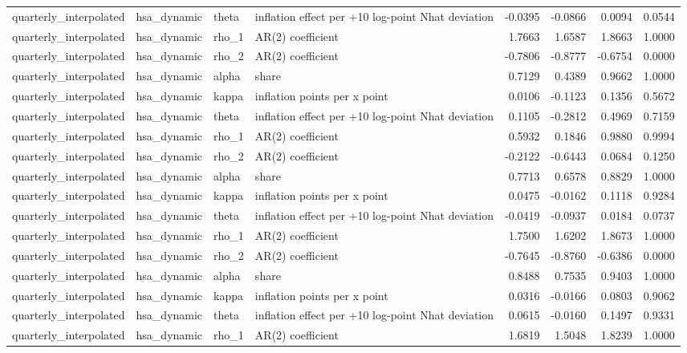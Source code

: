 \begin{tabular}{llllrrrr}
quarterly\_interpolated & hsa\_dynamic & theta & inflation effect per +10 log-point Nhat deviation & -0.0395 & -0.0866 & 0.0094 & 0.0544 \\
quarterly\_interpolated & hsa\_dynamic & rho\_1 & AR(2) coefficient & 1.7663 & 1.6587 & 1.8663 & 1.0000 \\
quarterly\_interpolated & hsa\_dynamic & rho\_2 & AR(2) coefficient & -0.7806 & -0.8777 & -0.6754 & 0.0000 \\
quarterly\_interpolated & hsa\_dynamic & alpha & share & 0.7129 & 0.4389 & 0.9662 & 1.0000 \\
quarterly\_interpolated & hsa\_dynamic & kappa & inflation points per x point & 0.0106 & -0.1123 & 0.1356 & 0.5672 \\
quarterly\_interpolated & hsa\_dynamic & theta & inflation effect per +10 log-point Nhat deviation & 0.1105 & -0.2812 & 0.4969 & 0.7159 \\
quarterly\_interpolated & hsa\_dynamic & rho\_1 & AR(2) coefficient & 0.5932 & 0.1846 & 0.9880 & 0.9994 \\
quarterly\_interpolated & hsa\_dynamic & rho\_2 & AR(2) coefficient & -0.2122 & -0.6443 & 0.0684 & 0.1250 \\
quarterly\_interpolated & hsa\_dynamic & alpha & share & 0.7713 & 0.6578 & 0.8829 & 1.0000 \\
quarterly\_interpolated & hsa\_dynamic & kappa & inflation points per x point & 0.0475 & -0.0162 & 0.1118 & 0.9284 \\
quarterly\_interpolated & hsa\_dynamic & theta & inflation effect per +10 log-point Nhat deviation & -0.0419 & -0.0937 & 0.0184 & 0.0737 \\
quarterly\_interpolated & hsa\_dynamic & rho\_1 & AR(2) coefficient & 1.7500 & 1.6202 & 1.8673 & 1.0000 \\
quarterly\_interpolated & hsa\_dynamic & rho\_2 & AR(2) coefficient & -0.7645 & -0.8760 & -0.6386 & 0.0000 \\
quarterly\_interpolated & hsa\_dynamic & alpha & share & 0.8488 & 0.7535 & 0.9403 & 1.0000 \\
quarterly\_interpolated & hsa\_dynamic & kappa & inflation points per x point & 0.0316 & -0.0166 & 0.0803 & 0.9062 \\
quarterly\_interpolated & hsa\_dynamic & theta & inflation effect per +10 log-point Nhat deviation & 0.0615 & -0.0160 & 0.1497 & 0.9331 \\
quarterly\_interpolated & hsa\_dynamic & rho\_1 & AR(2) coefficient & 1.6819 & 1.5048 & 1.8239 & 1.0000 \\

\end{tabular}

